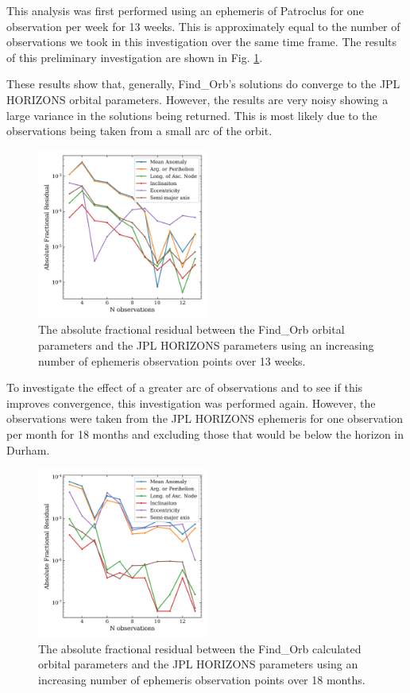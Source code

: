 \documentclass[10pt, twocolumn]{revtex4}    %
\begin{document}
This analysis was first performed using an ephemeris of Patroclus for one observation per week for 13 weeks. This is approximately equal to the number of observations we took in this investigation over the same time frame. The results of this preliminary investigation are shown in Fig. \ref{fig: JPL-find orb convergence}.

These results show that, generally, Find\_Orb's solutions do converge to the JPL HORIZONS orbital parameters. However, the results are very noisy showing a large variance in the solutions being returned. This is most likely due to the observations being taken from a small arc of the orbit.

\begin{figure}[h!]
\centering
\includegraphics[width=0.5\textwidth]{20180424_175040_JPL_FINDORB_CONVERGENCE}
\caption{The absolute fractional residual between the Find\_Orb orbital parameters and the JPL HORIZONS parameters using an increasing number of ephemeris observation points over 13 weeks.}
\label{fig: JPL-find orb convergence}
\end{figure}

To investigate the effect of a greater arc of observations and to see if this improves convergence, this investigation was performed again. However, the observations were taken from the JPL HORIZONS ephemeris for one observation per month for 18 months and excluding those that would be below the horizon in Durham.
\begin{figure}[h!]
\centering
\includegraphics[width=0.5\textwidth]{20180424_175052_JPL_FINDORB_CONVERGENCE}
\caption{The absolute fractional residual between the Find\_Orb calculated orbital parameters and the JPL HORIZONS parameters using an increasing number of ephemeris observation points over 18 months.}
\label{fig: JPL-find orb convergence 18mth}
\end{figure}
\end{document}
